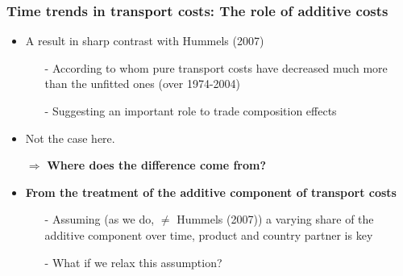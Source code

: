 \documentclass[10 pt,Helvetica, french]{beamer}
\begin{document}
\begin{frame}[label = slide_compeffects_results]
\frametitle{Time trends in transport costs: The role of additive costs}
\begin{itemize}
\item A result in sharp contrast with Hummels (2007) \vspace{0.1cm}
\begin{itemize}
\item[-] According to whom pure transport costs have decreased much more than the unfitted ones (over 1974-2004) \vspace{0.1cm}
\item[-] Suggesting an important role to trade composition effects  \vspace{0.1cm}
\end{itemize}
\item Not the case here. \vspace{0.1cm}
\item[$\Rightarrow$] \textbf{Where does the difference come from?} \vspace{0.1cm}
\item \textbf{From the treatment of the additive component of transport costs} \vspace{0.1cm}
\begin{itemize}
\item[-] Assuming (as we do, $\neq$ Hummels (2007)) a varying share of the additive component over time, product and country partner is key \vspace{0.1cm}
\item[-] What if we relax this assumption?
\end{itemize}\vspace{0.1cm}
\end{itemize}

\end{frame}
\end{document}
